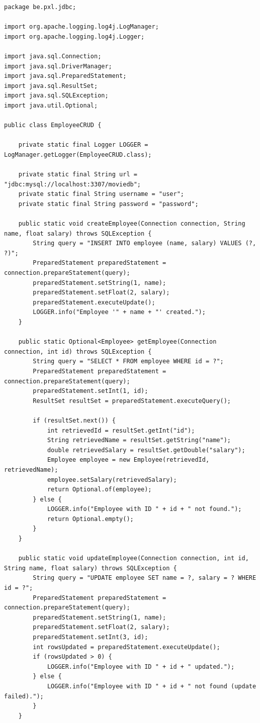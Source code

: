 \begin{lstlisting}
package be.pxl.jdbc;

import org.apache.logging.log4j.LogManager;
import org.apache.logging.log4j.Logger;

import java.sql.Connection;
import java.sql.DriverManager;
import java.sql.PreparedStatement;
import java.sql.ResultSet;
import java.sql.SQLException;
import java.util.Optional;

public class EmployeeCRUD {

	private static final Logger LOGGER = LogManager.getLogger(EmployeeCRUD.class);

	private static final String url = "jdbc:mysql://localhost:3307/moviedb";
	private static final String username = "user";
	private static final String password = "password";

	public static void createEmployee(Connection connection, String name, float salary) throws SQLException {
		String query = "INSERT INTO employee (name, salary) VALUES (?, ?)";
		PreparedStatement preparedStatement = connection.prepareStatement(query);
		preparedStatement.setString(1, name);
		preparedStatement.setFloat(2, salary);
		preparedStatement.executeUpdate();
		LOGGER.info("Employee '" + name + "' created.");
	}

	public static Optional<Employee> getEmployee(Connection connection, int id) throws SQLException {
		String query = "SELECT * FROM employee WHERE id = ?";
		PreparedStatement preparedStatement = connection.prepareStatement(query);
		preparedStatement.setInt(1, id);
		ResultSet resultSet = preparedStatement.executeQuery();

		if (resultSet.next()) {
			int retrievedId = resultSet.getInt("id");
			String retrievedName = resultSet.getString("name");
			double retrievedSalary = resultSet.getDouble("salary");
			Employee employee = new Employee(retrievedId, retrievedName);
			employee.setSalary(retrievedSalary);
			return Optional.of(employee);
		} else {
			LOGGER.info("Employee with ID " + id + " not found.");
			return Optional.empty();
		}
	}

	public static void updateEmployee(Connection connection, int id, String name, float salary) throws SQLException {
		String query = "UPDATE employee SET name = ?, salary = ? WHERE id = ?";
		PreparedStatement preparedStatement = connection.prepareStatement(query);
		preparedStatement.setString(1, name);
		preparedStatement.setFloat(2, salary);
		preparedStatement.setInt(3, id);
		int rowsUpdated = preparedStatement.executeUpdate();
		if (rowsUpdated > 0) {
			LOGGER.info("Employee with ID " + id + " updated.");
		} else {
			LOGGER.info("Employee with ID " + id + " not found (update failed).");
		}
	}


\end{lstlisting}
